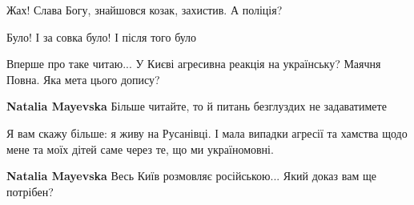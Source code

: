 \begin{itemize}
Жах! Слава Богу, знайшовся козак, захистив. А поліція?

 
Було! І за совка було! І після того було

 
Вперше про таке читаю... У Києві агресивна реакція на українську? Маячня Повна. Яка мета цього допису?

\begin{itemize}
 
\textbf{Natalia Mayevska} Більше читайте, то й питань безглуздих не задаватимете

 
Я вам скажу більше: я живу на Русанівці. І мала випадки агресії та хамства щодо мене та моїх дітей саме через те, що ми україномовні.

 
\textbf{Natalia Mayevska} Весь Київ розмовляє російською...
Який доказ вам ще потрібен?

 

\end{itemize}
\end{itemize}
